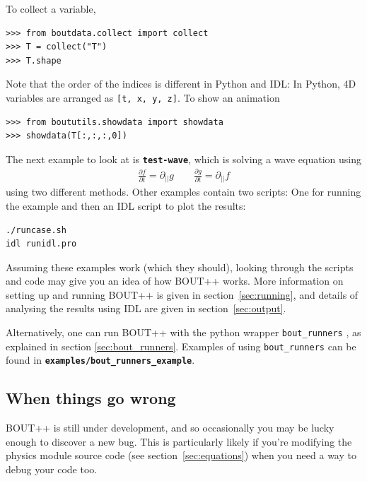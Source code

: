 \documentclass[12pt]{article}
\newcommand{\code}[1]{\texttt{#1}}
\newcommand{\file}[1]{\texttt{\bf #1}}
\newcommand{\deriv}[2]{\ensuremath{\frac{\partial #1}{\partial #2}}}
\begin{document}
%
To collect a variable,
%
\begin{verbatim}
>>> from boutdata.collect import collect
>>> T = collect("T")
>>> T.shape
\end{verbatim}
%
Note that the order of the indices is different in Python and IDL: In Python,
4D variables are arranged as \code{[t, x, y, z]}.  To show an animation
%
\begin{verbatim}
>>> from boututils.showdata import showdata
>>> showdata(T[:,:,:,0])
\end{verbatim}
%
The next example to look at is \file{test-wave}, which is solving a wave
equation using
%
\begin{align}
\deriv{f}{t} = \partial_{||} g \qquad \deriv{g}{t} = \partial_{||} f
\end{align}
%
using two different methods. Other examples contain two scripts: One for
running the example and then an IDL script to plot the results:
%
\begin{verbatim}
./runcase.sh
idl runidl.pro
\end{verbatim}
%
Assuming these examples work (which they should), looking through the scripts
and code may give you an idea of how BOUT++ works. More information on setting
up and running BOUT++ is given in section~\ref{sec:running}, and details of
analysing the results using IDL are given in section~\ref{sec:output}.

Alternatively, one can run BOUT++ with the python wrapper
%
\lstinline!bout_runners!
%
, as explained in section \ref{sec:bout_runners}. Examples of using
%
\lstinline!bout_runners!
%
can be found in \file{examples/bout\_runners\_example}.



\subsection{When things go wrong}
%
BOUT++ is still under development, and so occasionally you may be lucky enough
to discover a new bug. This is particularly likely if you're modifying the
physics module source code (see section~\ref{sec:equations}) when you need a
way to debug your code too.
\end{document}
